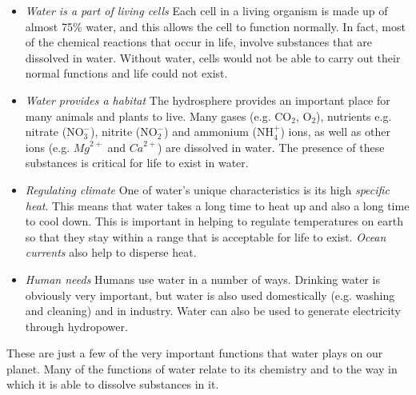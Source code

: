       \label{m38138*id335082}\begin{itemize}[noitemsep]
            \label{m38138*uid15}\item \textsl{Water is a part of living cells}
Each cell in a living organism is made up of almost 75\% water, and this allows the cell to function normally. In fact, most of the chemical reactions that occur in life, involve substances that are dissolved in water. Without water, cells would not be able to carry out their normal functions and life could not exist.
\label{m38138*uid16}\item \textsl{Water provides a habitat}
The hydrosphere provides an important place for many animals and plants to live. Many gases (e.g. ${\mathrm{CO}}_{2}$, ${\mathrm{O}}_{2}$), nutrients e.g. nitrate ($\mathrm{NO}_{3}^{-}$), nitrite ($\mathrm{NO}_{2}^{-}$) and ammonium ($\mathrm{NH}_{4}^{+}$) ions, as well as other ions (e.g. ${Mg}^{2+}$ and ${Ca}^{2+}$) are dissolved in water. The presence of these substances is critical for life to exist in water.
\label{m38138*uid17}\item \textsl{Regulating climate}
One of water's unique characteristics is its high \textsl{specific heat}. This means that water takes a long time to heat up and also a long time to cool down. This is important in helping to regulate temperatures on earth so that they stay within a range that is acceptable for life to exist. \textsl{Ocean currents} also help to disperse heat.
\label{m38138*uid18}\item \textsl{Human needs}
Humans use water in a number of ways. Drinking water is obviously very important, but water is also used domestically (e.g. washing and cleaning) and in industry. Water can also be used to generate electricity through hydropower.
\end{itemize}
      \label{m38138*id335280}These are just a few of the very important functions that water plays on our planet. Many of the functions of water relate to its chemistry and to the way in which it is able to dissolve substances in it.\par 
